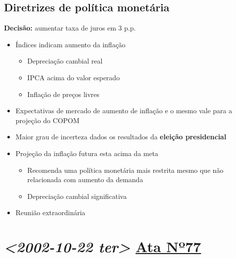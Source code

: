 \documentclass[11pt]{article}
\begin{document}
\subsection*{Diretrizes de política monetária}
\label{sec:orgaa8449f}
\textbf{Decisão:} aumentar taxa de juros em 3 p.p.
\begin{itemize}
\item Índices indicam aumento da inflação
\begin{itemize}
\item Depreciação cambial real
\item IPCA acima do valor esperado
\item Inflação de preços livres
\end{itemize}
\item Expectativas de mercado de aumento de inflação e o mesmo vale para a projeção do COPOM
\item Maior grau de incerteza dados os resultados da \textbf{eleição presidencial}
\item Projeção da inflação futura esta acima da meta
\begin{itemize}
\item Recomenda uma política monetária mais restrita mesmo que não relacionada com aumento da demanda
\item Depreciação cambial significativa
\end{itemize}
\item Reunião extraordinária
\end{itemize}

\section*{\textit{<2002-10-22 ter> } \href{https://www.bcb.gov.br/publicacoes/atascopom/22102002}{Ata Nº77}}
\label{sec:orgded5d27}
\end{document}
